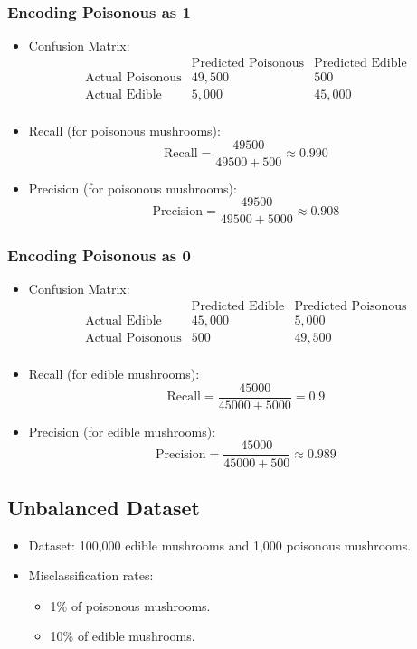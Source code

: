 \begin{notechapter}
\subsubsection{Encoding Poisonous as 1}
\begin{itemize}
    \item Confusion Matrix:
    \[
    \begin{array}{c|cc}
        & \text{Predicted Poisonous} & \text{Predicted Edible} \\
        \hline
        \text{Actual Poisonous} & 49,500 & 500 \\
        \text{Actual Edible} & 5,000 & 45,000 \\
    \end{array}
    \]
    \item Recall (for poisonous mushrooms):
    \[
    \text{Recall} = \frac{49500}{49500 + 500} \approx 0.990
    \]
    \item Precision (for poisonous mushrooms):
    \[
    \text{Precision} = \frac{49500}{49500 + 5000} \approx 0.908
    \]
\end{itemize}

\subsubsection{Encoding Poisonous as 0}
\begin{itemize}
    \item Confusion Matrix:
    \[
    \begin{array}{c|cc}
        & \text{Predicted Edible} & \text{Predicted Poisonous} \\
        \hline
        \text{Actual Edible} & 45,000 & 5,000 \\
        \text{Actual Poisonous} & 500 & 49,500 \\
    \end{array}
    \]
    \item Recall (for edible mushrooms):
    \[
    \text{Recall} = \frac{45000}{45000 + 5000} = 0.9
    \]
    \item Precision (for edible mushrooms):
    \[
    \text{Precision} = \frac{45000}{45000 + 500} \approx 0.989
    \]
\end{itemize}

\subsection{Unbalanced Dataset}
\begin{itemize}
    \item Dataset: 100,000 edible mushrooms and 1,000 poisonous 
    mushrooms.
    \item Misclassification rates:
        \begin{itemize}
            \item 1\% of poisonous mushrooms.
            \item 10\% of edible mushrooms.
        \end{itemize}
\end{itemize}


\end{notechapter}
